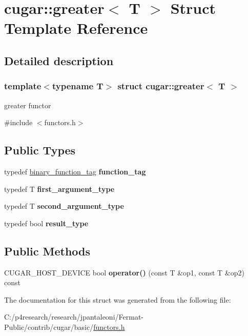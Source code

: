 \hypertarget{structcugar_1_1greater}{}\section{cugar\+:\+:greater$<$ T $>$ Struct Template Reference}
\label{structcugar_1_1greater}


\subsection{Detailed description}
\subsubsection*{template$<$typename T$>$\newline
struct cugar\+::greater$<$ T $>$}

greater functor 

{\ttfamily \#include $<$functors.\+h$>$}

\subsection*{Public Types}
\begin{DoxyCompactItemize}
\item 
\mbox{\label{structcugar_1_1greater_ae7551b71fae9d40442e3e0ef7a72877c}} 
typedef \hyperlink{structcugar_1_1binary__function__tag}{binary\+\_\+function\+\_\+tag} {\bfseries function\+\_\+tag}
\item 
\mbox{\label{structcugar_1_1greater_a768125f3a1b329bf29868442169aa9f1}} 
typedef T {\bfseries first\+\_\+argument\+\_\+type}
\item 
\mbox{\label{structcugar_1_1greater_ac4383aeb05e2828a8b03b02b9027a8e1}} 
typedef T {\bfseries second\+\_\+argument\+\_\+type}
\item 
\mbox{\label{structcugar_1_1greater_a5fb40ab823e24884fb0557c5c670bd3b}} 
typedef bool {\bfseries result\+\_\+type}
\end{DoxyCompactItemize}
\subsection*{Public Methods}
\begin{DoxyCompactItemize}
\item 
\mbox{\label{structcugar_1_1greater_ace030b3a67c6f567f3388bbba22474a5}} 
C\+U\+G\+A\+R\+\_\+\+H\+O\+S\+T\+\_\+\+D\+E\+V\+I\+CE bool {\bfseries operator()} (const T \&op1, const T \&op2) const
\end{DoxyCompactItemize}


The documentation for this struct was generated from the following file\+:\begin{DoxyCompactItemize}
\item 
C\+:/p4research/research/jpantaleoni/\+Fermat-\/\+Public/contrib/cugar/basic/\hyperlink{functors_8h}{functors.\+h}\end{DoxyCompactItemize}
